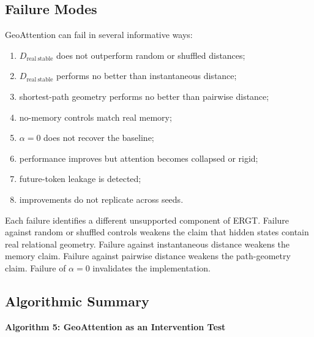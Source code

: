 \documentclass[11pt]{article}
\begin{document}
\subsection{Failure Modes}

GeoAttention can fail in several informative ways:
\begin{enumerate}[label=(\roman*)]
    \item $D_{\mathrm{real\ stable}}$ does not outperform random or shuffled distances;
    \item $D_{\mathrm{real\ stable}}$ performs no better than instantaneous distance;
    \item shortest-path geometry performs no better than pairwise distance;
    \item no-memory controls match real memory;
    \item $\alpha=0$ does not recover the baseline;
    \item performance improves but attention becomes collapsed or rigid;
    \item future-token leakage is detected;
    \item improvements do not replicate across seeds.
\end{enumerate}

Each failure identifies a different unsupported component of ERGT. Failure against random or shuffled controls weakens the claim that hidden states contain real relational geometry. Failure against instantaneous distance weakens the memory claim. Failure against pairwise distance weakens the path-geometry claim. Failure of $\alpha=0$ invalidates the implementation.

\subsection{Algorithmic Summary}

\noindent\textbf{Algorithm 5: GeoAttention as an Intervention Test}
\end{document}
